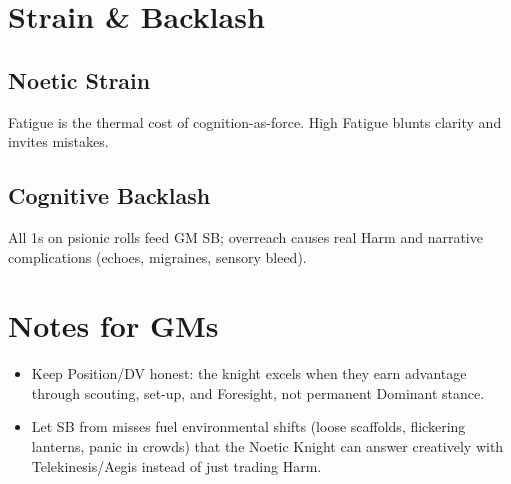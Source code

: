 \documentclass[11pt]{article}
\begin{document}
\section*{Strain \& Backlash}

\subsection*{Noetic Strain}
Fatigue is the thermal cost of cognition-as-force. High Fatigue blunts clarity and invites mistakes.

\subsection*{Cognitive Backlash}
All 1s on psionic rolls feed GM SB; overreach causes real Harm and narrative complications (echoes, migraines, sensory bleed).

\section*{Notes for GMs}
\begin{itemize}[leftmargin=*]
    \item Keep Position/DV honest: the knight excels when they earn advantage through scouting, set-up, and Foresight, not permanent Dominant stance.
    \item Let SB from misses fuel environmental shifts (loose scaffolds, flickering lanterns, panic in crowds) that the Noetic Knight can answer creatively with Telekinesis/Aegis instead of just trading Harm.
\end{itemize}
\end{document}
